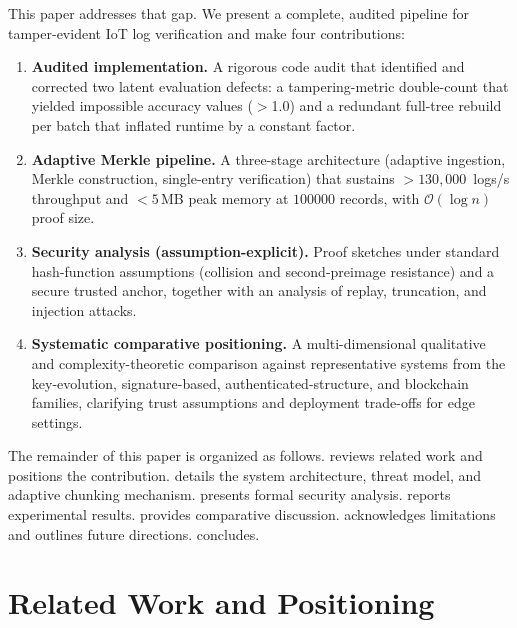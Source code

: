 \documentclass[preprint,12pt]{elsarticle}
\begin{document}
This paper addresses that gap.
We present a complete, audited pipeline for tamper-evident IoT log verification and make four contributions:

\begin{enumerate}[leftmargin=*, label=\textbf{C\arabic*.}]
  \item \textbf{Audited implementation.}
    A rigorous code audit that identified and corrected two latent evaluation defects: a tampering-metric double-count that yielded impossible accuracy values ($>$1.0) and a redundant full-tree rebuild per batch that inflated runtime by a constant factor.

  \item \textbf{Adaptive Merkle pipeline.}
    A three-stage architecture (adaptive ingestion, Merkle construction, single-entry verification) that sustains $>\!130{,}000$~logs/s throughput and $<\!5$\,MB peak memory at $100000$ records, with $\mathcal{O}(\log n)$ proof size.

  \item \textbf{Security analysis (assumption-explicit).}
    Proof sketches under standard hash-function assumptions (collision and second-preimage resistance) and a secure trusted anchor, together with an analysis of replay, truncation, and injection attacks.

  \item \textbf{Systematic comparative positioning.}
    A multi-dimensional qualitative and complexity-theoretic comparison against representative systems from the key-evolution, signature-based, authenticated-structure, and blockchain families, clarifying trust assumptions and deployment trade-offs for edge settings.
\end{enumerate}

The remainder of this paper is organized as follows.
 reviews related work and positions the contribution.
 details the system architecture, threat model, and adaptive chunking mechanism.
 presents formal security analysis.
 reports experimental results.
 provides comparative discussion.
 acknowledges limitations and outlines future directions.
 concludes.

\section{Related Work and Positioning}
\label{sec:related}
\end{document}
